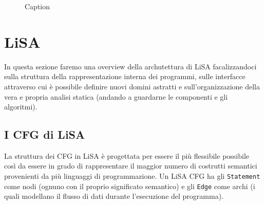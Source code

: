 \begin{figure}
    \caption{Caption}
    \label{fig:lisaAnalysisFlow}
\end{figure}

\section{LiSA}
In questa sezione faremo una overview della archutettura di LiSA facalizzandoci sulla struttura della rappresentazione interna dei programmi, sulle interfacce attraverso cui è possibile definire nuovi domini astratti e sull'organizzazione della vera e propria analisi statica (andando a guardarne le componenti e gli algoritmi).

\subsection{I CFG di LiSA}
La struttura dei CFG in LiSA è progettata per essere il più flessibile possibile così da essere in grado di rappresentare il maggior numero di costrutti semantici provenienti da più linguaggi di programmazione. Un LiSA CFG ha gli \texttt{Statement} come nodi (ognuno con il proprio significato semantico) e gli \texttt{Edge} come archi (i quali modellano il flusso di dati durante l'esecuzione del programma). 


